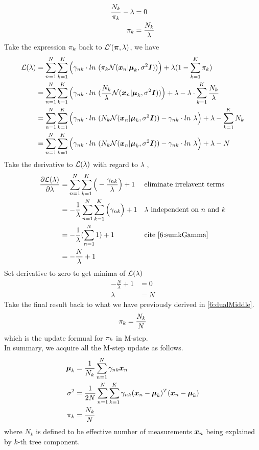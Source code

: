 \documentclass[11pt,a4paper]{article}
\newcommand{\htab}{\hspace*{0.63cm}}
\newcommand{\pg}{\\[0.3cm]}
\newcommand{\bmu}{\boldsymbol{\mu}}
\begin{document}
\begin{align}
    \frac{N_{k}}{\pi_{k}} - \lambda &= 0 \\
    \pi_{k} &= \frac{N_{k}}{ \lambda} \label{6:dualMiddle}
    \end{align}
\htab Take the expression $\pi_{k}$ back to $\mathcal{L}'(\boldsymbol{\pi},\lambda)$, we have
\begin{align}
    \lagl &= \sumn  \sumk \Big( \gamma_{nk} \cdot ln\ ( \pk \Nxn) \Big) + \lambda (1 - \sumk \pi_{k}) \\
    &= \sumn  \sumk \Big( \gamma_{nk} \cdot ln\ ( \frac{N_{k}}{ \lambda}  \Nxn) \Big) + \lambda - \lambda \cdot \sumk  \frac{N_{k}}{ \lambda} \\
    &= \sumn  \sumk \Big( \gamma_{nk} \cdot ln\ (N_{k} \Nxn) - \gamma_{nk} \cdot ln\ \lambda \Big) + \lambda -  \sumk N_{k} \\
    &= \sumn  \sumk \Big( \gamma_{nk} \cdot ln\ (N_{k} \Nxn) - \gamma_{nk} \cdot ln\ \lambda  \Big) + \lambda -  N 
    \end{align}
\htab Take the derivative to $\mathcal{L}(\lambda)$ with regard to $\lambda$ ,
\begin{align}
    \frac{\partial \mathcal{L}(\lambda)}{\partial \lambda} 
    &= \sum_{n=1}^{N}  \sum_{k=1}^{K} \Big(  - \frac{\gamma_{nk}}{\lambda}  \Big) + 1 &&\mbox{eliminate irrelavent terms} \\
    &= - \frac{1}{\lambda}\sum_{n=1}^{N}  \sum_{k=1}^{K} \Big( \gamma_{nk}  \Big) + 1 &&\mbox{$\lambda$ independent on $n$ and $k$}\\
    &= - \frac{1}{\lambda} (\sum_{n=1}^{N} 1) + 1 &&\mbox{cite \eqref{6:sumkGamma}} \\
    &= - \frac{N}{\lambda}  + 1 
    \end{align}
\htab Set derivative to zero to get minima of $\mathcal{L}(\lambda)$
\begin{align}
    - \frac{N}{\lambda}  + 1 &= 0 \\
    \lambda &= N 
    \end{align}
\htab Take the final result back to what we have previously derived in \eqref{6:dualMiddle}.
\begin{align}
    \pi_{k} = \frac{N_{k}}{N}
    \end{align}
\htab which is the update formual for $\pi_{k}$ in M-step. \pg
\htab In summary, we acquire all the M-step update as follows.
\begin{align}
    \bmu_{k}   &= \frac{1}{N_{k}}\sum_{n=1}^{N} \gamma_{nk} \xn \\
    \sigma^{2} &= \frac{1}{2N}\sumn \sumk \gamma_{nk} (\difxm)^{T} (\difxm) \\
    \pk &= \frac{N_{k}}{N}
    \end{align}
\htab where $N_{k}$ is defined to be effective number of measurements $\boldsymbol{x}_{n}$ being explained by $k$-th tree component.\\
\newpage
\end{document}
